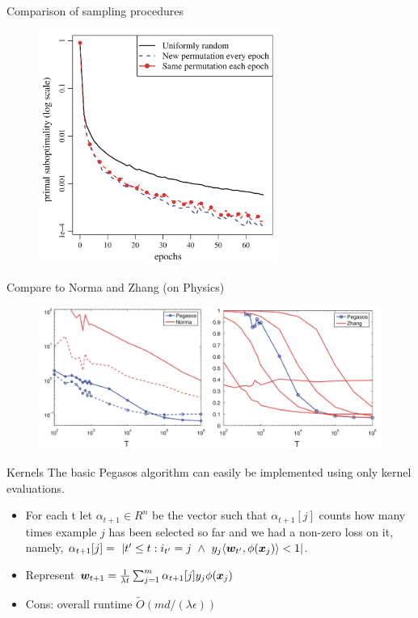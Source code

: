 \begin{frame}{Comparison of sampling procedures}
    \begin{figure}[htbp]
        \centering
        \includegraphics[height=0.7\textheight, width=0.7\textwidth]{images/epochs.png}
    \end{figure}
\end{frame}

\begin{frame}{Compare to Norma and Zhang (on Physics)}
    \begin{figure}[htbp]
        \centering
        \includegraphics[height=0.7\textheight, width=\textwidth]{images/comp_k.png}
    \end{figure}
\end{frame}

\begin{frame}{Kernels}
    The basic Pegasos algorithm can easily be implemented using only kernel evaluations.
    \begin{itemize}
        \item For each t let $\mathbb{\alpha}_{t+1}\in R^n$ be the vector such that $\alpha_{t+1}[j]$ counts how many times example $j$ has been selected so far and we had a non-zero loss on it, namely, $\alpha_{t+1}[j]=\ |{t'\le t:i_{t'}=j\ \wedge\ y_j\langle \wv_{t'},\phi(\xv_j)\rangle < 1}|$.
        \item Represent $\bm{w}_{t+1} = \frac{1}{\lambda t} \sum_{j=1}^{m} \alpha_{t+1}[j]y_j\phi(\bm{x}_j)$
        \item {\color{green}Cons: overall runtime $\tilde{O}(md/(\lambda \epsilon))$}
    \end{itemize}
\end{frame}

